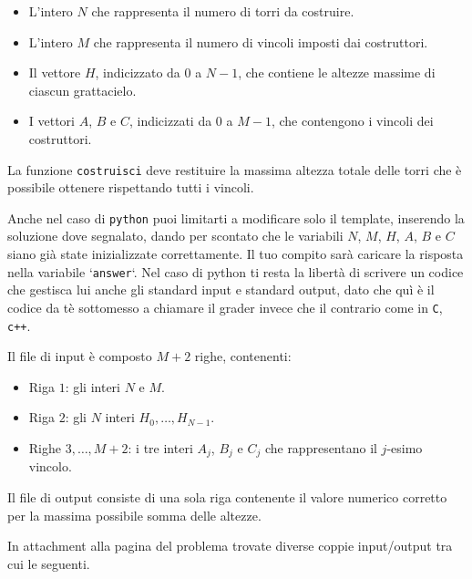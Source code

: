\begin{itemize}[nolistsep]
	\item L'intero $N$ che rappresenta il numero di torri da costruire.
	\item L'intero $M$ che rappresenta il numero di vincoli imposti dai
	      costruttori.
	\item Il vettore $H$, indicizzato da $0$ a $N-1$, che contiene le altezze
	      massime di ciascun grattacielo.
	\item I vettori $A$, $B$ e $C$, indicizzati da $0$ a $M-1$, che contengono i
	      vincoli dei costruttori.
\end{itemize}

\medskip

La funzione \texttt{costruisci} deve restituire la massima altezza totale delle torri che è possibile ottenere rispettando tutti i vincoli.

Anche nel caso di \verb'python' puoi limitarti a modificare solo il template, inserendo la soluzione dove segnalato, dando per scontato che le variabili $N$, $M$, $H$, $A$, $B$ e $C$ siano già state inizializzate correttamente. Il tuo compito sarà caricare la risposta nella variabile `\verb'answer'`. Nel caso di python ti resta la libertà di scrivere un codice che gestisca lui anche gli standard input e standard output, dato che quì è il codice da tè sottomesso a chiamare il grader invece che il contrario come in \verb'C', \verb'c++'.


\newpage
{}

Il file di input è composto $M+2$ righe, contenenti:
\begin{itemize}[nolistsep,itemsep=2mm]
\item Riga $1$: gli interi $N$ e $M$.
\item Riga $2$: gli $N$ interi $H_0, \dots, H_{N-1}$.
\item Righe $3, \dots, M+2$: i tre interi $A_j$, $B_j$ e $C_j$ che rappresentano il $j$-esimo vincolo.
\end{itemize}

Il file di output consiste di una sola riga contenente il valore numerico corretto per la massima possibile somma delle altezze.






In attachment alla pagina del problema trovate diverse coppie input/output tra cui le seguenti.


